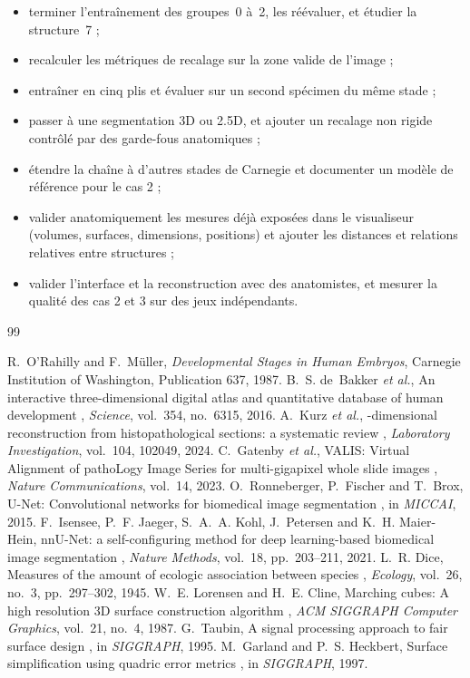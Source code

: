 \documentclass[12pt,a4paper]{report}
\begin{document}
\begin{itemize}
    \item terminer l'entraînement des groupes~0 à~2, les réévaluer, et étudier la structure~7 ;
    \item recalculer les métriques de recalage sur la zone valide de l'image ;
    \item entraîner en cinq plis et évaluer sur un second spécimen du même stade ;
    \item passer à une segmentation 3D ou 2.5D, et ajouter un recalage non rigide contrôlé par des garde-fous anatomiques ;
    \item étendre la chaîne à d'autres stades de Carnegie et documenter un modèle de référence pour le cas 2 ;
    \item valider anatomiquement les mesures déjà exposées dans le visualiseur (volumes, surfaces, dimensions, positions) et ajouter les distances et relations relatives entre structures ;
    \item valider l'interface et la reconstruction avec des anatomistes, et mesurer la qualité des cas 2 et 3 sur des jeux indépendants.
\end{itemize}

\begin{thebibliography}{99}
R.~O'Rahilly and F.~Müller, \textit{Developmental Stages in Human Embryos}, Carnegie Institution of Washington, Publication 637, 1987.
B.~S. de~Bakker \textit{et al.}, \og An interactive three-dimensional digital atlas and quantitative database of human development \fg, \textit{Science}, vol.~354, no.~6315, 2016.
A.~Kurz \textit{et al.}, -dimensional reconstruction from histopathological sections: a systematic review \fg, \textit{Laboratory Investigation}, vol.~104, 102049, 2024.
C.~Gatenby \textit{et al.}, \og VALIS: Virtual Alignment of pathoLogy Image Series for multi-gigapixel whole slide images \fg, \textit{Nature Communications}, vol.~14, 2023.
O.~Ronneberger, P.~Fischer and T.~Brox, \og U-Net: Convolutional networks for biomedical image segmentation \fg, in \textit{MICCAI}, 2015.
F.~Isensee, P.~F. Jaeger, S.~A.~A. Kohl, J.~Petersen and K.~H. Maier-Hein, \og nnU-Net: a self-configuring method for deep learning-based biomedical image segmentation \fg, \textit{Nature Methods}, vol.~18, pp.~203--211, 2021.
L.~R. Dice, \og Measures of the amount of ecologic association between species \fg, \textit{Ecology}, vol.~26, no.~3, pp.~297--302, 1945.
W.~E. Lorensen and H.~E. Cline, \og Marching cubes: A high resolution 3D surface construction algorithm \fg, \textit{ACM SIGGRAPH Computer Graphics}, vol.~21, no.~4, 1987.
G.~Taubin, \og A signal processing approach to fair surface design \fg, in \textit{SIGGRAPH}, 1995.
M.~Garland and P.~S. Heckbert, \og Surface simplification using quadric error metrics \fg, in \textit{SIGGRAPH}, 1997.
\end{thebibliography}
\end{document}
